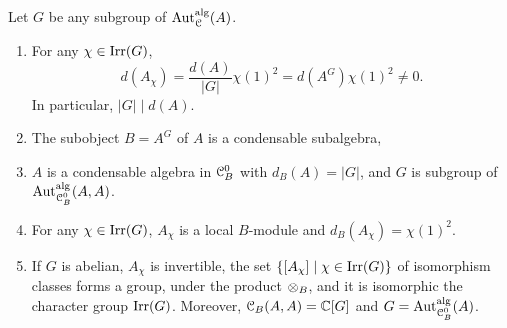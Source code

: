 \documentclass{amsart}
\begin{document}
\begin{prop} \label{p:5.16} Let $G$ be any subgroup of ${\operatorname{Aut}_{\EuScript{C}}^{\operatorname{alg}}}(A)$. 
\begin{enumerate}
    \item For any $\chi \in \operatorname{Irr}(G)$,
     $$
    d(A_\chi) = \frac{d(A)}{|G|} \chi(1)^2 = d(A^G) \chi(1) ^2\ne 0.
    $$
    In particular,  $|G| \mid d(A)$.
    \item The subobject $B=A^G$ of $A$ is a condensable subalgebra,
    \item $A$ is a condensable algebra in ${{\EuScript{C}}_B^0}$ with $d_B(A)=|G|$, and $G$ is subgroup of ${\rm Aut}_{{{\EuScript{C}}_B^0}}^{\operatorname{alg}}(A,A)$.
    \item For any $\chi \in \operatorname{Irr}(G)$, $A_\chi$ is a local $B$-module and $d_B(A_\chi) =\chi(1)^2$. 
    \item  If $G$ is abelian, $A_\chi$ is invertible, the set $\{[A_\chi] \mid \chi \in \operatorname{Irr}(G)\}$ of isomorphism classes  forms a group, under the product ${\otimes}_B$, and it is isomorphic the character group 
    $\operatorname{Irr}(G)$. Moreover, ${\EuScript{C}}_B(A,A)= \mathbb{C}[G]$ and $G = {\rm Aut}_{{{\EuScript{C}}_B^0}}^{\operatorname{alg}}(A)$.
\end{enumerate}
\end{prop}
\end{document}
